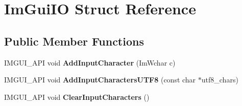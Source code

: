 \hypertarget{struct_im_gui_i_o}{}\section{Im\+Gui\+IO Struct Reference}
\label{struct_im_gui_i_o}
\subsection*{Public Member Functions}
\begin{DoxyCompactItemize}
\item 
\mbox{\label{struct_im_gui_i_o_a3b41ecf9d6e9b29e7272b7ec38660fee}} 
I\+M\+G\+U\+I\+\_\+\+A\+PI void {\bfseries Add\+Input\+Character} (Im\+Wchar c)
\item 
\mbox{\label{struct_im_gui_i_o_a2f8e116f87a4eed2ba51c578083cc1fd}} 
I\+M\+G\+U\+I\+\_\+\+A\+PI void {\bfseries Add\+Input\+Characters\+U\+T\+F8} (const char $\ast$utf8\+\_\+chars)
\item 
\mbox{\label{struct_im_gui_i_o_ac168ef7924d4e8e89eddec77a3c1d825}} 
I\+M\+G\+U\+I\+\_\+\+A\+PI void {\bfseries Clear\+Input\+Characters} ()
\end{DoxyCompactItemize}

